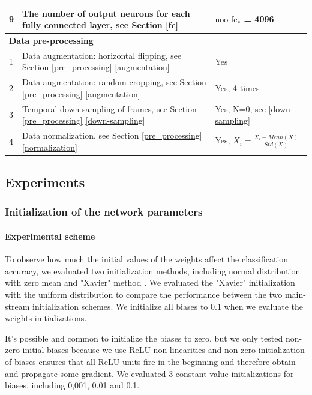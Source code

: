 \begin{table}
\begin{center}
\begin{tabular}{| m{0.6cm} | m{7cm} | m{6cm} |}
  			9 &  The number of output neurons for each fully connected layer, see Section \ref{fc} & \(\text{noo\_fc}_*\) = 4096 \\ \hline \hline                           
  			
  			\multicolumn{3}{|l|}{\textbf{Data pre-processing}}  \\ \hline
  			1 & Data augmentation: horizontal flipping, see Section \ref{pre_processing} \ref{augmentation} & Yes  \\ \hline
  			2 & Data augmentation: random cropping, see Section \ref{pre_processing} \ref{augmentation} & Yes, 4 times \\ \hline
  			3 & Temporal down-sampling of frames, see Section \ref{pre_processing} \ref{down-sampling} & Yes, N=0, see \ref{down-sampling} \\ \hline

  			4 & Data normalization, see Section \ref{pre_processing} \ref{normalization} & Yes, \(X_i = \frac{X_i - Mean(X)}{Std(X)}\) \\ \hline			
  		\end{tabular}
  		\label{table:default_paras}
  	\end{center}
  \end{table} 
   
\subsection{Experiments}
\subsubsection{Initialization of the network parameters}
\paragraph{Experimental scheme}
To observe how much the initial values of the weights affect the classification accuracy,  we evaluated two initialization methods, including normal distribution with zero mean  and "Xavier" method \cite{xavier}. We evaluated the "Xavier" initialization with the uniform distribution to compare the performance between the two main-stream initialization schemes. We initialize all biases to \(0.1\) when we evaluate the weights initializations.
\par 
It's possible and common to initialize the biases to zero, but we only tested non-zero initial biases  because we use ReLU non-linearities and non-zero initialization of biases ensures that all ReLU units fire in the beginning and therefore obtain and propagate some gradient. We evaluated 3 constant value initializations for biases, including 0,001, 0.01 and 0.1. 

